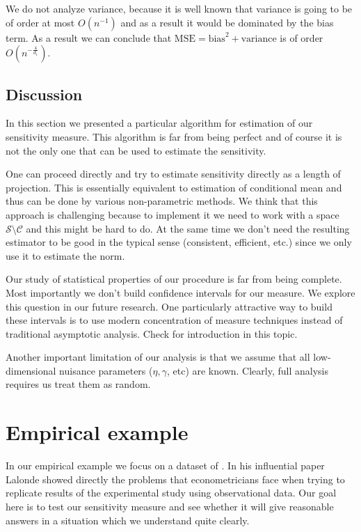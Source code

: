 \documentclass[12pt]{article}
\theoremstyle{plain}
\begin{document}
We do not analyze variance, because it is well known that variance is going to be of order at most $O(n^{-1})$ and as a result it would be dominated by the bias term. As a result we can conclude that $\text{MSE} = \text{bias}^2 + \text{variance}$ is of order $O\left(n^{-\frac{4}{d_1}}\right)$.

\subsection{Discussion} 

In this section we presented a particular algorithm for estimation of our sensitivity measure. This algorithm is far from being perfect and of course it is not the only one that can be used to estimate the sensitivity. 

One can proceed directly and try to estimate sensitivity directly as a length of projection. This is essentially equivalent to estimation of conditional mean and thus can be done by various non-parametric methods. We think that this approach is challenging because to implement it we need to work with a space $\mathcal{S}\setminus \mathcal {C}$ and this might be hard to do. At the same time we don't need the resulting estimator to be good in the typical sense (consistent, efficient, etc.) since we only use it to estimate the norm.

Our study of statistical properties of our procedure is far from being complete. Most importantly we don't build confidence intervals for our measure. We explore this question in our future research. One particularly attractive way to build these intervals is to use modern concentration of measure techniques instead of traditional asymptotic analysis. Check \parencite{boucheron2013concentration} for introduction in this topic. 

Another important limitation of our analysis is that we assume that all low-dimensional nuisance parameters ($\eta,\gamma$, etc) are known. Clearly, full analysis requires us treat them as random. 


\section{Empirical example}

In our empirical example we focus on a dataset of \parencite{lalonde1986evaluating}. In his influential paper Lalonde showed directly the problems that econometricians face when trying to replicate results of the experimental study using observational data. Our goal here is to test our sensitivity measure and see whether it will give reasonable answers in a situation which we understand quite clearly.
\end{document}
